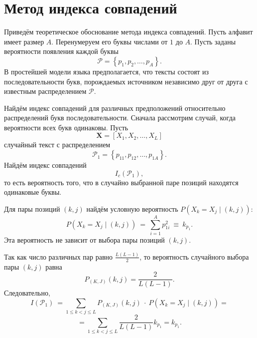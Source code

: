 \section{Метод индекса совпадений}
\label{chap:coincide-index}

Приведём теоретическое обоснование метода индекса совпадений. Пусть алфавит имеет размер $A$. Перенумеруем его буквы числами от $1$ до $A$. Пусть заданы вероятности появления каждой буквы
    \[ \mathcal{P} = \left\{ {p_1 ,p_2 ,  \ldots , p_A } \right\}. \]
В простейшей модели языка предполагается, что тексты состоят из последовательности букв, порождаемых источником независимо друг от друга с известным распределением $\mathcal{P}$.

Найдём индекс совпадений для различных предположений относительно распределений букв последовательности. Сначала рассмотрим случай, когда вероятности всех букв одинаковы. Пусть
    \[ \mathbf{X} = \left[ X_1, X_2, \dots, X_L \right] \]
случайный текст с распределением
    \[ \mathcal{P}_1 = \left\{ p_{11}, p_{12}, \dots, p_{1A} \right\}. \]
Найдём индекс совпадений
    \[ I_c(\mathcal{P}_1), \]
то есть вероятность того, что в случайно выбранной паре позиций находятся одинаковые буквы.

Для пары позиций $(k,j)$ найдём условную вероятность $P \left( X_k  = X_j \mid (k,j) \right)$:
    \[ P \left( X_k  = X_j \mid (k,j) \right) ~=~ \sum\limits_{i=1}^A p_{1i}^2 ~\equiv~ k_{p_1}. \]
Эта вероятность не зависит от выбора пары позиций $(k,j)$.

Так как число различных пар равно $\frac{L(L - 1)}{2}$, то вероятность случайного выбора пары $(k,j)$  равна
    \[ P_{(K,J)} (k,j) = \frac{2}{L(L - 1)}. \]
Следовательно,
\[
    I(\mathcal{P}_1) ~= \sum \limits_{1 \leq k < j \leq L} P_{(K,J)}(k,j) ~\cdot~ P(X_k  = X_j \mid (k,j)) =
\] \[
    = \sum \limits_{1 \leq k < j \leq L} \frac{2}{L(L - 1)} k_{p_1} = k_{p_1}.
\]

